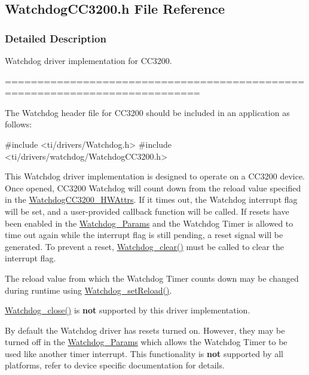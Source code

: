 \subsection{Watchdog\+C\+C3200.\+h File Reference}
\label{_watchdog_c_c3200_8h}


\subsubsection{Detailed Description}
Watchdog driver implementation for C\+C3200. 

============================================================================

The Watchdog header file for C\+C3200 should be included in an application as follows\+: 
\begin{DoxyCode}
\textcolor{preprocessor}{#include <ti/drivers/Watchdog.h>}
\textcolor{preprocessor}{#include <ti/drivers/watchdog/WatchdogCC3200.h>}
\end{DoxyCode}


This Watchdog driver implementation is designed to operate on a C\+C3200 device. Once opened, C\+C3200 Watchdog will count down from the reload value specified in the \hyperlink{struct_watchdog_c_c3200___h_w_attrs}{Watchdog\+C\+C3200\+\_\+\+H\+W\+Attrs}. If it times out, the Watchdog interrupt flag will be set, and a user-\/provided callback function will be called. If resets have been enabled in the \hyperlink{struct_watchdog___params}{Watchdog\+\_\+\+Params} and the Watchdog Timer is allowed to time out again while the interrupt flag is still pending, a reset signal will be generated. To prevent a reset, \hyperlink{_watchdog_8h_a396decd6b1807db10c636f9987c3be4c}{Watchdog\+\_\+clear()} must be called to clear the interrupt flag.

The reload value from which the Watchdog Timer counts down may be changed during runtime using \hyperlink{_watchdog_8h_a77ec81e1304fe05b77a9976e10e2d9a3}{Watchdog\+\_\+set\+Reload()}.

\hyperlink{_watchdog_8h_a1c0dfea7011b06f303d01afb631ffbdd}{Watchdog\+\_\+close()} is {\bfseries not} supported by this driver implementation.

By default the Watchdog driver has resets turned on. However, they may be turned off in the \hyperlink{struct_watchdog___params}{Watchdog\+\_\+\+Params} which allows the Watchdog Timer to be used like another timer interrupt. This functionality is {\bfseries not} supported by all platforms, refer to device specific documentation for details.

